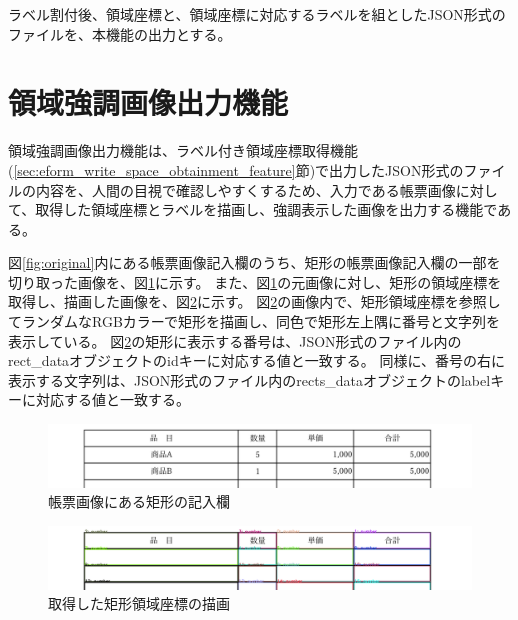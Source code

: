 ラベル割付後、領域座標と、領域座標に対応するラベルを組としたJSON形式のファイルを、本機能の出力とする。


\section{領域強調画像出力機能}\label{sec:highlighted_area_image_output}
領域強調画像出力機能は、ラベル付き領域座標取得機能(\ref{sec:eform_write_space_obtainment_feature}節)で出力したJSON形式のファイルの内容を、人間の目視で確認しやすくするため、入力である帳票画像に対して、取得した領域座標とラベルを描画し、強調表示した画像を出力する機能である。

図\ref{fig:original}内にある帳票画像記入欄のうち、矩形の帳票画像記入欄の一部を切り取った画像を、図\ref{fig:rect_original}に示す。
また、図\ref{fig:rect_original}の元画像に対し、矩形の領域座標を取得し、描画した画像を、図\ref{fig:rect_drawing}に示す。
図\ref{fig:rect_drawing}の画像内で、矩形領域座標を参照してランダムなRGBカラーで矩形を描画し、同色で矩形左上隅に番号と文字列を表示している。
図\ref{fig:rect_drawing}の矩形に表示する番号は、JSON形式のファイル内のrect\_dataオブジェクトのidキーに対応する値と一致する。
同様に、番号の右に表示する文字列は、JSON形式のファイル内のrects\_dataオブジェクトのlabelキーに対応する値と一致する。

\begin{figure}[t]
    \begin{center}
        \includegraphics[width=15cm]{image/03-function/rect_original.jpg}
        \caption{帳票画像にある矩形の記入欄}
        \label{fig:rect_original}
    \end{center}
\end{figure}

\begin{figure}[t]
    \begin{center}
        \includegraphics[width=15cm]{image/03-function/rects_with_label.png}
        \caption{取得した矩形領域座標の描画}
        \label{fig:rect_drawing}
    \end{center}
\end{figure}

